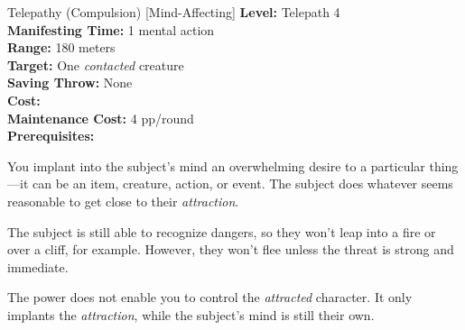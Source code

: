 {Telepathy (Compulsion) [Mind-Affecting]}
{
	\textbf{Level:}
	Telepath 4\\
	\textbf{Manifesting Time:}
	1 mental action\\
	\textbf{Range:}
	180  meters\\
	\textbf{Target:}
	One \emph{contacted} creature\\
	\textbf{Saving Throw:}
	None\\
	\textbf{Cost:}
	\\
	\textbf{Maintenance Cost:}
	4 pp/round\\
	\textbf{Prerequisites:}
	\\
}
{
	You implant into the subject's mind an overwhelming desire to a particular thing---it can be an item, creature, action, or event. The subject does whatever seems reasonable to get close to their \emph{attraction}.

	The subject is still able to recognize dangers, so they won't leap into a fire or over a cliff, for example. However, they won't flee unless the threat is strong and immediate.

	The power does not enable you to control the \emph{attracted} character. It only implants the \emph{attraction}, while the subject's mind is still their own.
}
